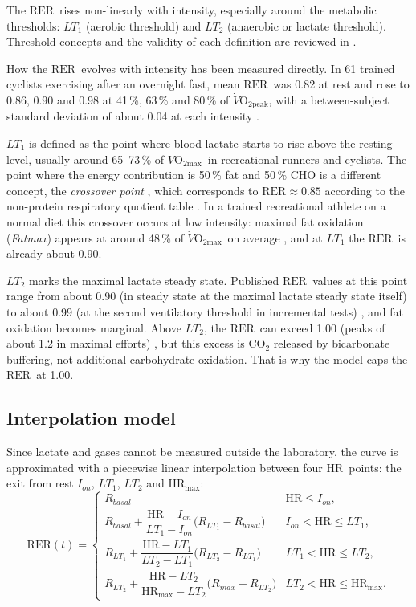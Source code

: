 \documentclass[10pt,a4paper]{article}
\newcommand{\VOmax}{\ensuremath{\dot V\mathrm{O_{2max}}}}
\newcommand{\RER}{\ensuremath{\mathrm{RER}}}
\newcommand{\FC}{\ensuremath{\mathrm{HR}}}
\begin{document}
The \RER\ rises non-linearly with intensity, especially around the metabolic thresholds:
$LT_1$ (aerobic threshold) and $LT_2$ (anaerobic or lactate threshold). Threshold concepts
and the validity of each definition are reviewed in \citet{faude2009}.

How the \RER\ evolves with intensity has been measured directly. In 61 trained cyclists
exercising after an overnight fast, mean \RER\ was 0.82 at rest and rose to 0.86, 0.90 and
0.98 at 41\,\%, 63\,\% and 80\,\% of $\dot V\mathrm{O_{2peak}}$, with a between-subject
standard deviation of about 0.04 at each intensity \citep{goedecke2000}.

$LT_1$ is defined as the point where blood lactate starts to rise above the resting level,
usually around 65--73\,\% of \VOmax\ in recreational runners and cyclists. The point where
the energy contribution is 50\,\% fat and 50\,\% CHO is a different concept, the
\emph{crossover point} \citep{brooks1994}, which corresponds to $\RER\approx0.85$ according
to the non-protein respiratory quotient table \citep{peronnet1991}. In a trained
recreational athlete on a normal diet this crossover occurs at low intensity: maximal fat
oxidation (\emph{Fatmax}) appears at around 48\,\% of \VOmax\ on average
\citep{venables2005}, and at $LT_1$ the \RER\ is already about 0.90.

$LT_2$ marks the maximal lactate steady state. Published \RER\ values at this point range
from about 0.90 (in steady state at the maximal lactate steady state itself) to about 0.99
(at the second ventilatory threshold in incremental tests) \citep{peinado2016}, and fat
oxidation becomes marginal. Above $LT_2$, the \RER\ can exceed 1.00 (peaks of about 1.2 in
maximal efforts) \citep{edvardsen2014}, but this excess is CO$_2$ released by bicarbonate
buffering, not additional carbohydrate oxidation. That is why the model caps the \RER\ at
1.00.

\subsection{Interpolation model}
Since lactate and gases cannot be measured outside the laboratory, the curve is
approximated with a piecewise linear interpolation between four \FC\ points: the exit from
rest $I_{on}$, $LT_1$, $LT_2$ and $\FC_{\mathrm{max}}$:
\begin{equation}
\RER(t)=
\begin{cases}
R_{basal} & \FC\le I_{on},\\[4pt]
R_{basal}+\dfrac{\FC-I_{on}}{LT_1-I_{on}}\bigl(R_{LT_1}-R_{basal}\bigr) & I_{on}<\FC\le LT_1,\\[10pt]
R_{LT_1}+\dfrac{\FC-LT_1}{LT_2-LT_1}\bigl(R_{LT_2}-R_{LT_1}\bigr) & LT_1<\FC\le LT_2,\\[10pt]
R_{LT_2}+\dfrac{\FC-LT_2}{\FC_{\mathrm{max}}-LT_2}\bigl(R_{max}-R_{LT_2}\bigr) & LT_2<\FC\le\FC_{\mathrm{max}}.
\end{cases}
\label{eq:rer}
\end{equation}
\end{document}
